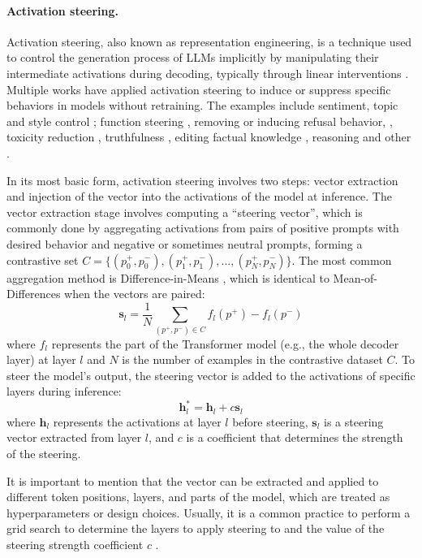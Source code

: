 \documentclass{article} %
\begin{document}
\paragraph{Activation steering.}

Activation steering, also known as representation engineering, is a technique used to control the generation process of LLMs implicitly by manipulating their intermediate activations during decoding, typically through linear interventions \citep{panickssery2023steering, turner2308activation}. Multiple works have applied activation steering to induce or suppress specific behaviors in models without retraining. The examples include sentiment, topic and style control \citep{turner2308activation}; function steering \citep{todd2023function, postmus2024steering}, removing or inducing refusal behavior, \citep{lee2024programming}, toxicity reduction \citep{turner2308activation}, truthfulness \citep{wang2025adaptive}, editing factual knowledge \citep{yin2024lofit}, reasoning \citep{zhanguncovering, galichin2025have} and other \citep{wehner2025taxonomy}.

In its most basic form, activation steering involves two steps: vector extraction and injection of the vector into the activations of the model at inference. The vector extraction stage involves computing a “steering vector”, which is commonly done by aggregating activations from pairs of positive prompts with desired behavior and negative or sometimes neutral prompts, forming a contrastive set \(C = \{(p_0^+, p_0^-), (p_1^+, p_1^-), ..., (p_N^+, p_N^-)\}\).
The most common aggregation method is Difference-in-Means \citep{wehner2025taxonomy}, which is identical to Mean-of-Differences when the vectors are paired:
\[\boldsymbol{s}_l = \frac{1}{N} \sum_{(p^+, p^-) \in C} f_l(p^+) - f_l(p^-)\]
where \(f_l\) represents the part of the Transformer model (e.g., the whole decoder layer) at layer \(l\) and \(N\) is the number of examples in the contrastive dataset \(C\).
To steer the model's output, the steering vector is added to the activations of specific layers during inference:
\[
\boldsymbol{h}_{l}^* = \boldsymbol{h}_{l} + c \boldsymbol{s}_l
\]
where \(\boldsymbol{h}_{l}\) represents the activations at layer \(l\) before steering, \(\boldsymbol{s}_l\) is a steering vector extracted from layer \(l\), and \(c\) is a coefficient that determines the strength of the steering.

It is important to mention that the vector can be extracted and applied to different token positions, layers, and parts of the model, which are treated as hyperparameters or design choices. Usually, it is a common practice to perform a grid search to determine the layers to apply steering to and the value of the steering strength coefficient \(c\) \citep{turner2308activation, lee2024programming, wang2025adaptive, dong2024contrans, panickssery2023steering, wang2024semantics, stolfo2024improving, zhanguncovering, postmus2024steering}.
\end{document}
